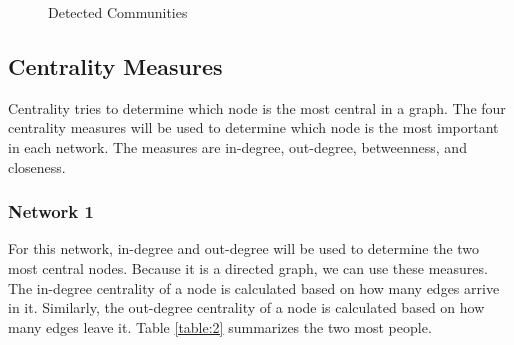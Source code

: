 \begin{figure}[t]
{{    \label{fig:comm_5}}}
    \qquad
    \caption{Detected Communities}
    \label{fig:5}
\end{figure}

\subsection{Centrality Measures}
Centrality tries to determine which node is the most central in a graph. The four centrality measures will be used to determine which node is the most important in each network. The measures are in-degree, out-degree, betweenness, and closeness.

\subsubsection{Network 1}
For this network, in-degree and out-degree will be used to determine the two most central nodes. Because it is a directed graph, we can use these measures. The in-degree centrality of a node is calculated based on how many edges arrive in it. Similarly, the out-degree centrality of a node is calculated based on how many edges leave it. Table \ref{table:2} summarizes the two most people.
\begin{table}
    \centering
    \qquad
    \caption{Network 1 centrality}
    \label{table:2}
\end{table}

